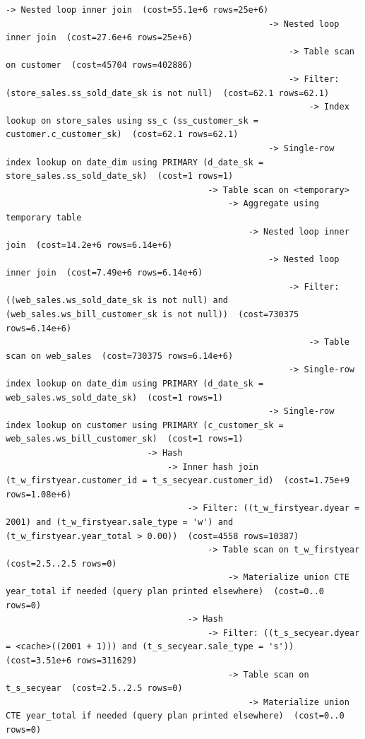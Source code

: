 \documentclass{ULBreport}
\begin{document}
\begin{lstlisting}[caption={Baseline \texttt{EXPLAIN FORMAT=TREE} on SF8 for Query 11}, label={lst:q11_explain_orig}, basicstyle=\ttfamily\scriptsize, breaklines=true, frame=single]
                                                -> Nested loop inner join  (cost=55.1e+6 rows=25e+6)
                                                    -> Nested loop inner join  (cost=27.6e+6 rows=25e+6)
                                                        -> Table scan on customer  (cost=45704 rows=402886)
                                                        -> Filter: (store_sales.ss_sold_date_sk is not null)  (cost=62.1 rows=62.1)
                                                            -> Index lookup on store_sales using ss_c (ss_customer_sk = customer.c_customer_sk)  (cost=62.1 rows=62.1)
                                                    -> Single-row index lookup on date_dim using PRIMARY (d_date_sk = store_sales.ss_sold_date_sk)  (cost=1 rows=1)
                                        -> Table scan on <temporary>
                                            -> Aggregate using temporary table
                                                -> Nested loop inner join  (cost=14.2e+6 rows=6.14e+6)
                                                    -> Nested loop inner join  (cost=7.49e+6 rows=6.14e+6)
                                                        -> Filter: ((web_sales.ws_sold_date_sk is not null) and (web_sales.ws_bill_customer_sk is not null))  (cost=730375 rows=6.14e+6)
                                                            -> Table scan on web_sales  (cost=730375 rows=6.14e+6)
                                                        -> Single-row index lookup on date_dim using PRIMARY (d_date_sk = web_sales.ws_sold_date_sk)  (cost=1 rows=1)
                                                    -> Single-row index lookup on customer using PRIMARY (c_customer_sk = web_sales.ws_bill_customer_sk)  (cost=1 rows=1)
                            -> Hash
                                -> Inner hash join (t_w_firstyear.customer_id = t_s_secyear.customer_id)  (cost=1.75e+9 rows=1.08e+6)
                                    -> Filter: ((t_w_firstyear.dyear = 2001) and (t_w_firstyear.sale_type = 'w') and (t_w_firstyear.year_total > 0.00))  (cost=4558 rows=10387)
                                        -> Table scan on t_w_firstyear  (cost=2.5..2.5 rows=0)
                                            -> Materialize union CTE year_total if needed (query plan printed elsewhere)  (cost=0..0 rows=0)
                                    -> Hash
                                        -> Filter: ((t_s_secyear.dyear = <cache>((2001 + 1))) and (t_s_secyear.sale_type = 's'))  (cost=3.51e+6 rows=311629)
                                            -> Table scan on t_s_secyear  (cost=2.5..2.5 rows=0)
                                                -> Materialize union CTE year_total if needed (query plan printed elsewhere)  (cost=0..0 rows=0)


\end{lstlisting}
\end{document}
